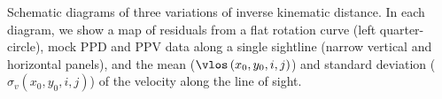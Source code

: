 \label{fig:diagram} Schematic diagrams of three variations of inverse kinematic distance. In each diagram, we show a map of residuals from a flat rotation curve (left quarter-circle), mock PPD and PPV data along a single sightline (narrow vertical and horizontal panels), and the mean ($\vlos\left(x_0, y_0, i, j\right)$) and standard deviation ($\sigma_v\left(x_0, y_0, i, j\right)$) of the velocity along the line of sight.  